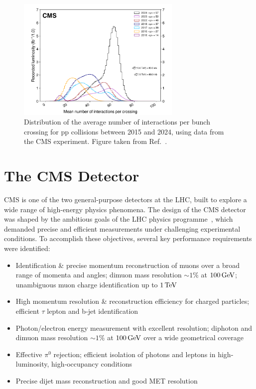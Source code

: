 \begin{figure}[!htbp]
\centering
\includegraphics[width= 0.7\textwidth]{Figures/Chapter3/CMS_Pileup.pdf}
\caption[Distribution of the average number of interactions per bunch crossing for pp collisions at CMS between 2015 and 2024]{Distribution of the average number of interactions per bunch crossing for pp collisions between 2015 and 2024, using data from the \ac{CMS} experiment. Figure taken from Ref.~\cite{CMS_IntegratedLumi}.}
\label{Figure:Chapter3_CMS_Pileup}
\end{figure}

\section{The CMS Detector}
\label{Section:Chapter3_CMS_Detector_Introduction}
\ac{CMS} is one of the two general-purpose detectors at the \ac{LHC}, built to explore a wide range of high-energy physics phenomena. The design of the \ac{CMS} detector was shaped by the ambitious goals of the \ac{LHC} physics programme~\cite{LHC_CMS}, which demanded precise and efficient measurements under challenging experimental conditions. To accomplish these objectives, several key performance requirements were identified:

\begin{itemize}
  \item Identification \& precise momentum reconstruction of muons over a broad range of momenta and angles; dimuon mass resolution $\sim1\%$ at $100\,\text{Ge\hspace{-.08em}V}$; unambiguous muon charge identification up to $1\,\text{Te\hspace{-.08em}V}$
  \item High momentum resolution \& reconstruction efficiency for charged particles; efficient $\tau$ lepton and b‐jet identification
  \item Photon/electron energy measurement with excellent resolution; diphoton and dimuon mass resolution $\sim1\%$ at $100\,\text{Ge\hspace{-.08em}V}$ over a wide geometrical coverage
  \item Effective $\pi^0$ rejection; efficient isolation of photons and leptons in high‐luminosity, high‐occupancy conditions
  \item Precise dijet mass reconstruction and good \ac{MET} resolution
\end{itemize}


